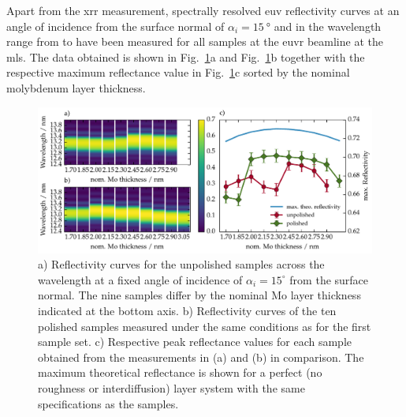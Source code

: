 Apart from the \gls{xrr} measurement, spectrally resolved \gls{euv} reflectivity curves at an angle of incidence from the surface normal of $\alpha_i=\SI{15}{\degree}$ and in the wavelength range from  to  have been measured for all samples at the \gls{euvr} beamline at the \gls{mls}. The data obtained is shown in Fig.~\ref{ch_spec:fig_EUV_reflectivity_unpolished_and_polished_with_peak_refl}a and Fig.~\ref{ch_spec:fig_EUV_reflectivity_unpolished_and_polished_with_peak_refl}b together with the respective maximum reflectance value in Fig.~\ref{ch_spec:fig_EUV_reflectivity_unpolished_and_polished_with_peak_refl}c sorted by the nominal molybdenum layer thickness.
\begin{figure}[htbp]
\centering
\includegraphics[width=\textwidth]{img/EUV_reflectivity_with_peak}
\caption{a) Reflectivity curves for the unpolished samples across the wavelength at a fixed angle of incidence of $\alpha_i = 15^\circ$ from the surface normal. The nine samples differ by the nominal Mo layer thickness indicated at the bottom axis. b) Reflectivity curves of the ten polished samples measured under the same conditions as for the first sample set. c) Respective peak reflectance values for each sample obtained from the measurements in (a) and (b) in comparison. The maximum theoretical reflectance is shown for a perfect (no roughness or interdiffusion) layer system with the same specifications as the samples.}
\label{ch_spec:fig_EUV_reflectivity_unpolished_and_polished_with_peak_refl}
\end{figure}
